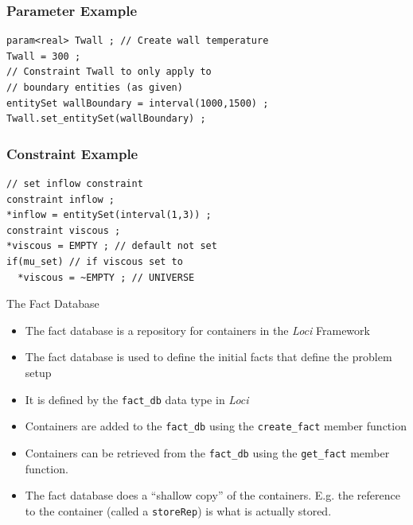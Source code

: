 \documentclass{beamer}
\begin{document}
\begin{frame}[fragile=singleslide]\frametitle{Parameter Example}
\begin{verbatim}
param<real> Twall ; // Create wall temperature
Twall = 300 ;
// Constraint Twall to only apply to
// boundary entities (as given)
entitySet wallBoundary = interval(1000,1500) ;
Twall.set_entitySet(wallBoundary) ;
\end{verbatim}
\end{frame}


\begin{frame}[fragile=singleslide]\frametitle{Constraint Example}
\begin{verbatim}
// set inflow constraint
constraint inflow ;
*inflow = entitySet(interval(1,3)) ;
constraint viscous ;
*viscous = EMPTY ; // default not set
if(mu_set) // if viscous set to
  *viscous = ~EMPTY ; // UNIVERSE
\end{verbatim}
\end{frame}

\begin{frame}{The Fact Database}
\begin{itemize}
\item The fact database is a repository for containers in the {\it Loci} Framework
\item The fact database is used to define the initial facts that define the problem setup
\item It is defined by the {\tt fact\_db} data type in {\it Loci}
\item Containers are added to the {\tt fact\_db} using the {\tt create\_fact} member function
\item Containers can be retrieved from the {\tt fact\_db} using the {\tt get\_fact} member function.
\item The fact database does a ``shallow copy'' of the containers.  E.g. the reference to the container (called a {\tt storeRep}) is what is actually stored.
\end{itemize}
\end{frame}
\end{document}
